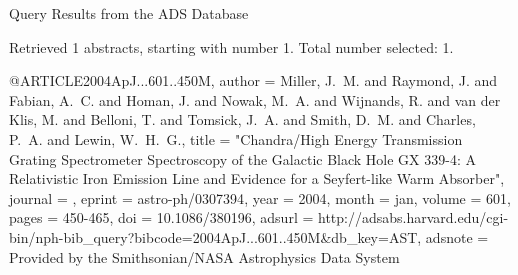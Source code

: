 Query Results from the ADS Database


Retrieved 1 abstracts, starting with number 1.  Total number selected: 1.

@ARTICLE{2004ApJ...601..450M,
   author = {{Miller}, J.~M. and {Raymond}, J. and {Fabian}, A.~C. and {Homan}, J. and 
	{Nowak}, M.~A. and {Wijnands}, R. and {van der Klis}, M. and 
	{Belloni}, T. and {Tomsick}, J.~A. and {Smith}, D.~M. and {Charles}, P.~A. and 
	{Lewin}, W.~H.~G.},
    title = "{Chandra/High Energy Transmission Grating Spectrometer Spectroscopy of the Galactic Black Hole GX 339-4: A Relativistic Iron Emission Line and Evidence for a Seyfert-like Warm Absorber}",
  journal = {\apj},
   eprint = {astro-ph/0307394},
     year = 2004,
    month = jan,
   volume = 601,
    pages = {450-465},
      doi = {10.1086/380196},
   adsurl = {http://adsabs.harvard.edu/cgi-bin/nph-bib_query?bibcode=2004ApJ...601..450M&db_key=AST},
  adsnote = {Provided by the Smithsonian/NASA Astrophysics Data System}
}


